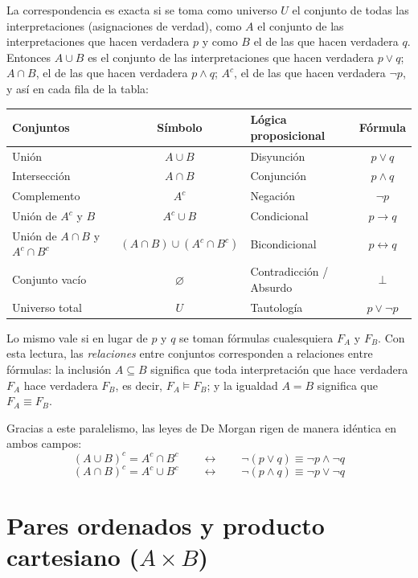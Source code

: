 La correspondencia es exacta si se toma como universo $U$ el conjunto
de todas las interpretaciones (asignaciones de verdad), como $A$ el
conjunto de las interpretaciones que hacen verdadera $p$ y como $B$ el
de las que hacen verdadera $q$. Entonces $A \cup B$ es el conjunto de
las interpretaciones que hacen verdadera $p \lor q$; $A \cap B$, el de
las que hacen verdadera $p \land q$; $A^c$, el de las que hacen
verdadera $\neg p$, y así en cada fila de la tabla:

\begin{center}
\begin{tabular}{|l|c|l|c|}
\hline
\textbf{Conjuntos} & \textbf{Símbolo} & \textbf{Lógica proposicional} & \textbf{Fórmula} \\
\hline
Unión & $A \cup B$ & Disyunción & $p \lor q$ \\
Intersección & $A \cap B$ & Conjunción & $p \land q$ \\
Complemento & $A^c$ & Negación & $\neg p$ \\
Unión de $A^c$ y $B$ & $A^c \cup B$ & Condicional & $p \to q$ \\
Unión de $A \cap B$ y $A^c \cap B^c$ & $(A \cap B) \cup (A^c \cap B^c)$ & Bicondicional & $p \leftrightarrow q$ \\
Conjunto vacío & $\varnothing$ & Contradicción / Absurdo & $\bot$ \\
Universo total & $U$ & Tautología & $p \lor \neg p$ \\
\hline
\end{tabular}
\end{center}

Lo mismo vale si en lugar de $p$ y $q$ se toman fórmulas cualesquiera
$F_A$ y $F_B$.
Con esta lectura, las \emph{relaciones} entre conjuntos corresponden a
relaciones entre fórmulas: la inclusión $A \subseteq B$ significa que
toda interpretación que hace verdadera $F_A$ hace verdadera $F_B$, es
decir, $F_A \models F_B$; y la igualdad $A = B$ significa que $F_A \equiv F_B$.

Gracias a este paralelismo, las leyes de De Morgan rigen de manera idéntica en ambos campos:
\[
(A \cup B)^c = A^c \cap B^c \qquad \longleftrightarrow \qquad \neg (p \lor q) \equiv \neg p \land \neg q
\]
\[
(A \cap B)^c = A^c \cup B^c \qquad \longleftrightarrow \qquad \neg (p \land q) \equiv \neg p \lor \neg q
\]

\section{Pares ordenados y producto cartesiano (\texorpdfstring{$A \times B$}{A x B})}

